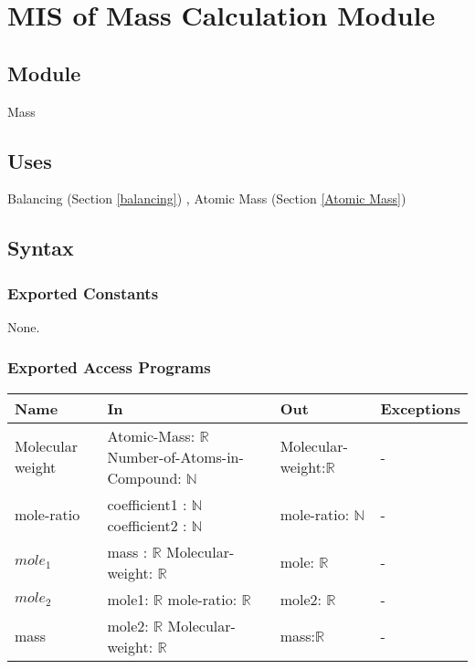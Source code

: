 \documentclass[12pt, titlepage]{article}
\begin{document}
\newpage
  
\section{MIS of Mass Calculation Module} \label{Mass} 

\subsection{Module}

Mass

\subsection{Uses}

Balancing (Section \ref{balancing}) , Atomic Mass (Section \ref{Atomic Mass})

\subsection{Syntax}

\subsubsection{Exported Constants}

None.

\subsubsection{Exported Access Programs}

\begin{center}
\begin{tabular}{p{2cm} p{4cm} p{4cm} p{2cm}}
\hline
\textbf{Name} & \textbf{In} & \textbf{Out} & \textbf{Exceptions} \\
\hline
{Molecular weight} & Atomic-Mass: $\mathbb{R}$
  \newline Number-of-Atoms-in-Compound: $\mathbb{N}$ & Molecular-weight:$\mathbb{R}$ & - \\
\hline
{mole-ratio}  & coefficient1 : $\mathbb{N}$
  \newline coefficient2 : $\mathbb{N}$ & mole-ratio: $\mathbb{N}$  & - \\
  \hline
{$mole_1$}  & mass : $\mathbb{R}$
  \newline Molecular-weight: $\mathbb{R}$ & mole: $\mathbb{R}$  & - \\
\hline
{$mole_2$} & mole1: $\mathbb{R}$
  \newline mole-ratio: $\mathbb{R}$ & mole2: $\mathbb{R}$ & - \\
 \hline
 {mass} & mole2: $\mathbb{R}$
  \newline Molecular-weight: $\mathbb{R}$ & mass:$\mathbb{R}$ & - \\
\hline
\end{tabular}
\end{center}
\end{document}
